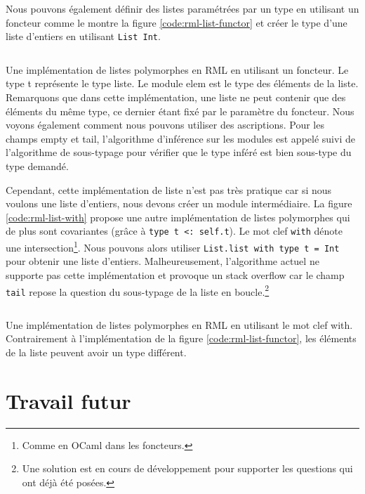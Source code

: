 Nous pouvons également définir des listes paramétrées par un type en utilisant un foncteur
comme le montre la figure \ref{code:rml-list-functor} et créer le type d'une
liste d'entiers en utilisant \verb|List Int|.

\begin{listing}
  \inputminted{OCaml}{codes/list_functor.rml}
  \caption{Une implémentation de listes polymorphes en RML en utilisant un
    foncteur. Le type t représente le type liste. Le module elem
    est le type des éléments de la liste. Remarquons que dans cette
    implémentation, une liste ne peut contenir que des éléments du même type, ce
    dernier étant fixé par le paramètre du foncteur. Nous voyons également
    comment nous pouvons utiliser des ascriptions. Pour les champs empty et
    tail, l'algorithme d'inférence sur les modules est appelé suivi de
    l'algorithme de sous-typage pour vérifier que le type inféré est bien
    sous-type du type demandé.}
  \label{code:rml-list-functor}
\end{listing}

Cependant, cette implémentation de liste n'est pas très pratique car si nous
voulons une liste d'entiers, nous devons créer un module intermédiaire. La figure
\ref{code:rml-list-with} propose une autre implémentation de listes polymorphes
qui de plus sont covariantes (grâce à \verb|type t <: self.t|). Le mot clef
\verb|with| dénote une intersection\footnote{Comme en OCaml dans
  les foncteurs.}. Nous pouvons alors utiliser \verb|List.list with type t = Int|
pour obtenir une liste d'entiers. Malheureusement, l'algorithme actuel ne
supporte pas cette implémentation et provoque un stack overflow car le champ
\verb|tail| repose la question du sous-typage de la liste en
boucle.\footnote{Une solution est en cours de développement pour supporter les
  questions qui ont déjà été posées.}

\begin{listing}
  \inputminted{OCaml}{codes/list.rml}
  \caption{Une implémentation de listes polymorphes en RML en utilisant le mot
    clef with. Contrairement à l'implémentation de la figure
    \ref{code:rml-list-functor}, les éléments de la liste peuvent avoir un type
  différent.}
  \label{code:rml-list-with}
\end{listing}

\section{Travail futur}

